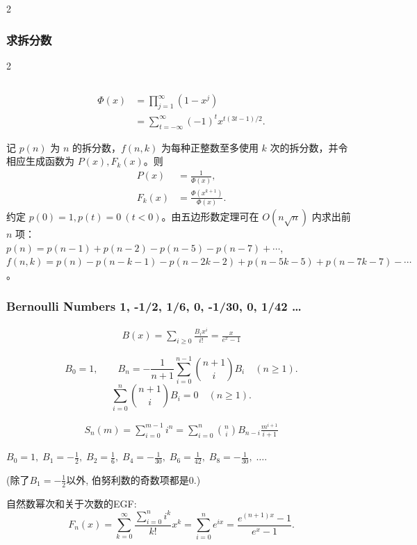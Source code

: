 \begin{footnotesize}
\begin{multicols*}{2}
\end{multicols*}

\subsubsection{求拆分数}
\begin{multicols*}{2}
\inputminted{python3}{sections/NumberTheory/assets/yzh/partition.py}
\[\begin{aligned}
\Phi(x)&=\prod_{j=1}^{\infty}(1-x^j)\\
&=\sum_{t=-\infty}^{\infty}(-1)^t x^{t(3t-1)/2}.
\end{aligned}\]

\newcolumn
	记 $p(n)$ 为 $n$ 的拆分数，$f(n,k)$ 为每种正整数至多使用 $k$ 次的拆分数，并令相应生成函数为 $P(x),F_k(x)$。则
	\[\begin{aligned}
	P(x)&=\frac1{\Phi(x)},\\
	F_k(x)&=\frac{\Phi(x^{k+1})}{\Phi(x)}.
	\end{aligned}\]
	约定 $p(0)=1,p(t)=0\ (t<0)$。由五边形数定理可在 $O(n\sqrt n)$ 内求出前 $n$ 项：\\
	$p(n) = p(n-1)+p(n-2)-p(n-5)-p(n-7)+\cdots$, \\
	$f(n,k)=p(n)-p(n-k-1)-p(n-2k-2)+p(n-5k-5)+p(n-7k-7)-\cdots$。
\end{multicols*}

\subsubsection{Bernoulli Numbers 1, -1/2, 1/6, 0, -1/30, 0, 1/42 \dots}

$$\begin{aligned}B(x)=\sum_{i\ge 0}\frac{B_i x^i}{i!}=\frac x{e^x-1}\end{aligned}$$

\[B_0=1,\qquad B_n=-\frac1{n+1}\sum_{i=0}^{n-1}\binom{n+1}{i}B_i\quad(n\ge1).\]
\[\sum_{i=0}^n\binom{n+1}{i}B_i=0\quad(n\ge1).\]

$$ \begin{aligned}S_n(m)=\sum_{i=0}^{m-1}i^n=\sum_{i=0}^n\binom{n}{i}B_{n-i}\frac{m^{i+1}}{i+1}\end{aligned} $$

$ B_0 = 1,\; B_1 = -\frac 1 2,\; B_2=\frac16,\; B_4 = -\frac 1 {30},\; B_6 = \frac 1 {42},\; B_8 = -\frac 1{30},\; \dots$.

(除了$B_1 = -\frac 1 2$以外, 伯努利数的奇数项都是$0$.)

自然数幂次和关于次数的EGF:
\[ F_n(x)=\sum_{k=0}^\infty \frac{\sum_{i=0}^n i^k}{k!}x^k
=\sum_{i=0}^n e^{ix}=\frac{e^{(n+1)x}-1}{e^x-1}. \]


\end{footnotesize}
